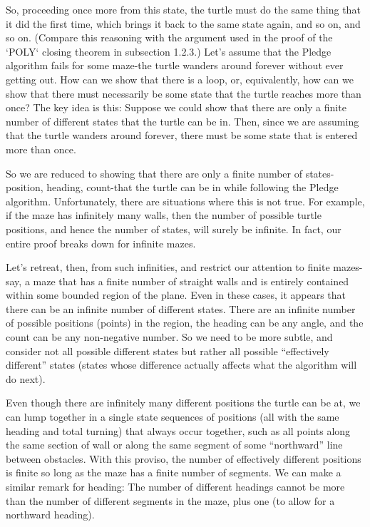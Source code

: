 \documentclass{book}
\begin{document}
So, proceeding once more from this state, the turtle must do the same
thing that it did the first time, which brings it back to the same state
again, and so on, and so on. (Compare this reasoning with the argument
used in the proof of the \textsc{`POLY`} closing theorem in subsection 1.2.3.)
Let's assume that the Pledge algorithm fails for some maze-the turtle
wanders around forever without ever getting out. How can we show
that there is a loop, or, equivalently, how can we show that there must
necessarily be some state that the turtle reaches more than once? The
key idea is this: Suppose we could show that there are only a finite
number of different states that the turtle can be in. Then, since we are
assuming that the turtle wanders around forever, there must be some
state that is entered more than once.

So we are reduced to showing that there are only a finite number
of states-position, heading, count-that the turtle can be in while
following the Pledge algorithm. Unfortunately, there are situations
where this is not true. For example, if the maze has infinitely many
walls, then the number of possible turtle positions, and hence the number
of states, will surely be infinite. In fact, our entire proof breaks down
for infinite mazes.

Let's retreat, then, from such infinities, and restrict our attention to
finite mazes-say, a maze that has a finite number of straight walls and
is entirely contained within some bounded region of the plane. Even in
these cases, it appears that there can be an infinite number of different
states. There are an infinite number of possible positions (points) in
the region, the heading can be any angle, and the count can be any
non-negative number. So we need to be more subtle, and consider not
all possible different states but rather all possible ``effectively different''
states (states whose difference actually affects what the algorithm will
do next).

Even though there are infinitely many different positions the turtle can
be at, we can lump together in a single state sequences of positions (all
with the same heading and total turning) that always occur together,
such as all points along the same section of wall or along the same
segment of some ``northward'' line between obstacles. With this proviso,
the number of effectively different positions is finite so long as the maze
has a finite number of segments. We can make a similar remark for
heading: The number of different headings cannot be more than the
number of different segments in the maze, plus one (to allow for a
northward heading).
\end{document}
